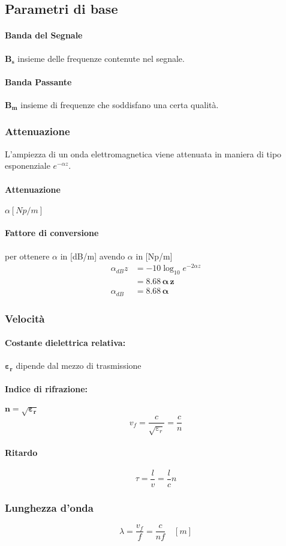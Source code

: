 \subsection{Parametri di base}
\paragraph{Banda del Segnale} $\mathbf{B_s}$ insieme delle frequenze contenute nel segnale.
\paragraph{Banda Passante} $\mathbf{B_m}$ insieme di frequenze che soddisfano una certa qualità.

\subsubsection{Attenuazione}
L'ampiezza di un onda elettromagnetica viene attenuata in maniera di tipo esponenziale $e^{-\alpha z}$.
\paragraph{Attenuazione} $\alpha [Np/m]$
\paragraph{Fattore di conversione} per ottenere $\alpha$ in [dB/m] avendo $\alpha$ in [Np/m]
\begin{align*}
	\alpha_{dB}z &= -10\log_{10}e^{-2\alpha z} \\
		     & = \mathbf{8.68\, \alpha\,z} \\
	\alpha_{dB} &=\mathbf{8.68\, \alpha}
\end{align*}

\subsubsection{Velocità}
\paragraph{Costante dielettrica relativa:}  $\mathbf{\varepsilon_r}$ dipende dal mezzo di trasmissione
\paragraph{Indice di rifrazione:} $\mathbf{n=\sqrt{\varepsilon_r}}$
\begin{equation}
	v_f = \frac{c}{\sqrt{\varepsilon_r}} = \frac{c}{n}
\end{equation}

\paragraph{Ritardo}
\begin{equation*}
	\tau = \frac{l}{v} = \frac{l}{c}n
\end{equation*}

\subsubsection{Lunghezza d'onda}
\begin{equation*}
	\lambda = \frac{v_f}{f} = \frac{c}{nf}\quad[m]
\end{equation*}
